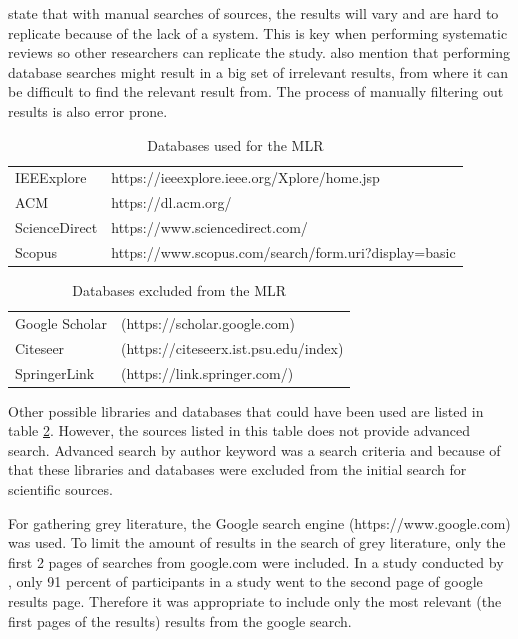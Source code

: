 \documentclass[english, 12pt, a4paper, sci, utf8, a-1b, online]{aaltothesis}
\begin{document}
\textcite{guidelines-for-snowballing} state that with manual searches of sources, the results will vary and are hard to replicate because of the lack of a system. This is key when performing systematic reviews so other researchers can replicate the study. \textcite{guidelines-for-snowballing} also mention that performing database searches might result in a big set of irrelevant results, from where it can be difficult to find the relevant result from. The process of manually filtering out results is also error prone.

\begin{table}
  \centering
  \begin{tabular}{ l l }
    \hline
    IEEExplore    & https://ieeexplore.ieee.org/Xplore/home.jsp          \\
    ACM           & https://dl.acm.org/                                  \\
    ScienceDirect & https://www.sciencedirect.com/                       \\
    Scopus        & https://www.scopus.com/search/form.uri?display=basic \\
    \hline
  \end{tabular}
  \caption{Databases used for the MLR}
  \label{table:included-databases}
\end{table}

\begin{table}
  \centering
  \begin{tabular}{ l l }
    \hline
    Google Scholar & (https://scholar.google.com)          \\
    Citeseer       & (https://citeseerx.ist.psu.edu/index) \\
    SpringerLink   & (https://link.springer.com/)          \\
    \hline
  \end{tabular}
  \caption{Databases excluded from the MLR}
  \label{table:excluded-databases}
\end{table}

Other possible libraries and databases that could have been used are listed in table \ref{table:excluded-databases}. However, the sources listed in this table does not provide advanced search. Advanced search by author keyword was a search criteria and because of that these libraries and databases were excluded from the initial search for scientific sources.

For gathering grey literature, the Google search engine (https://www.google.com) was used. To limit the amount of results in the search of grey literature, only the first 2 pages of searches from google.com were included. In a study conducted by \textcite{google-search}, only 91 percent of participants in a study went to the second page of google results page. Therefore it was appropriate to include only the most relevant (the first pages of the results) results from the google search. 
\end{document}
